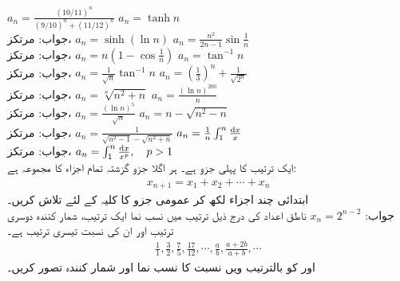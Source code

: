 $a_n=\frac{(10/{11})^n}{(9/{10})^n+(11/{12})^n}$
$a_n=\tanh n$\\
جواب:\quad
مرتکز، 
$a_n=\sinh (\ln n)$
$a_n=\frac{n^2}{2n-1}\sin\frac{1}{n}$\\
جواب:\quad
مرتکز، 
$a_n=n(1-\cos\frac{1}{n})$
$a_n=\tan^{-1}n$\\
جواب:\quad
مرتکز، 
$a_n=\frac{1}{\sqrt{n}}\tan^{-1}n$
$a_n=(\tfrac{1}{3})^n+\frac{1}{\sqrt{2^n}}$\\
جواب:\quad
مرتکز، 
$a_n=\sqrt[n]{n^2+n}$
$a_n=\frac{(\ln n)^{200}}{n}$\\
جواب:\quad
مرتکز، 
$a_n=\frac{(\ln n)^5}{\sqrt{n}}$
$a_n=n-\sqrt{n^2-n}$\\
جواب:\quad
مرتکز، 
$a_n=\frac{1}{\sqrt{n^2-1}-\sqrt{n^2+n}}$
$a_n=\frac{1}{n}\int_1^n \frac{\dif x}{x}$\\
جواب:\quad
مرتکز، 
$a_n=\int_1^n\frac{\dif x}{x^p},\quad p>1$
\\
ایک ترتیب کا پہلی جزو   ہے۔ ہر اگلا جزو گزشتہ تمام اجزاء کا مجموعہ ہے:
\begin{align*}
x_{n+1}=x_1+x_2+\cdots+x_{n}
\end{align*}
ابتدائی چند اجزاء لکھ کر عمومی جزو  کا کلیہ  کے لئے تلاش کریں۔ \\
جواب:\quad
$x_n=2^{n-2}$
ناطق اعداد کی درج ذیل ترتیب میں نسب نما ایک ترتیب، شمار کنندہ دوسری ترتیب اور ان کی نسبت تیسری ترتیب ہے۔
\begin{align*}
\frac{1}{1},\frac{3}{2},\frac{7}{5},\frac{17}{12},\cdots,\frac{a}{b},\frac{a+2b}{a+b},\cdots
\end{align*} 
 اور  کو بالترتیب  ویں نسبت  کا نسب نما اور شمار کنندہ تصور کریں۔
